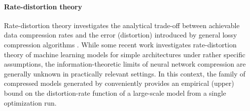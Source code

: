 \figureTradeoffCFour

\paragraph{Rate-distortion theory}

Rate-distortion theory investigates the analytical trade-off between
achievable data compression rates and the error (distortion) 
introduced by general lossy compression
algorithms \citep{cover_elements_2006}.
While some recent work \citep{gao_rate_2019,isik_information-theoretic_2022}
investigates rate-distortion theory of machine learning models
for simple architectures under rather specific assumptions, 
the information-theoretic limits of neural network compression
are generally unknown in practically relevant settings.
In this context, the family of compressed models generated by \methodname conveniently provides an empirical (upper) bound on the distortion-rate function of a large-scale model from a single optimization run.

